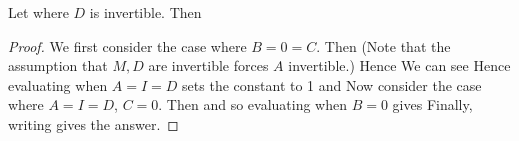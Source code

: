 \documentclass{article}
\begin{document}
\begin{prop}
Let 
where $D$ is invertible. Then 
\end{prop}
\begin{proof}
We first consider the case where $B=0=C$. Then 
(Note that the assumption that $M,D$ are invertible forces $A$ invertible.) Hence We can see 
Hence evaluating when $A=I=D$ sets the constant to 1 and 
Now consider the case where $A = I = D$, $C = 0$. Then 
and 
so evaluating when $B=0$ gives 
Finally, writing 
gives the answer. 
\end{proof}
\end{document}
